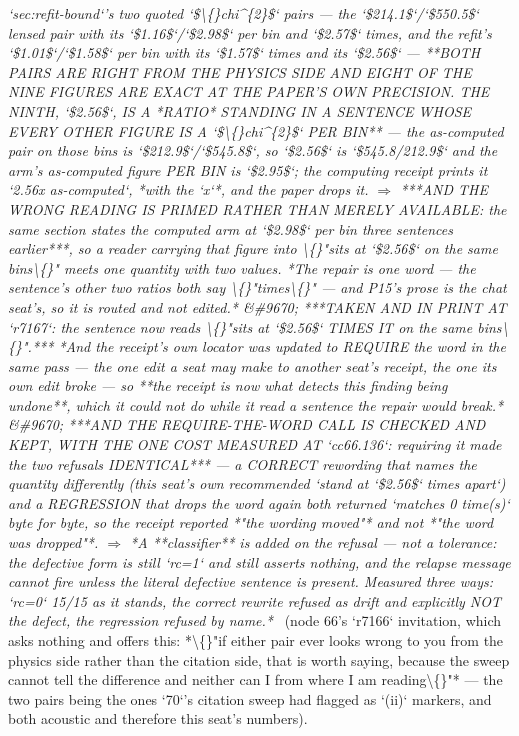 \begin{description}
\textit{`sec:refit-bound`'s two quoted `\$\textbackslash\{\}chi\textasciicircum{}\{2\}\$` pairs --- the `\$214.1\$`/`\$550.5\$` lensed pair with its `\$1.16\$`/`\$2.98\$` per bin and `\$2.57\$` times, and the refit's `\$1.01\$`/`\$1.58\$` per bin with its `\$1.57\$` times and its `\$2.56\$` ---  **BOTH PAIRS ARE RIGHT FROM THE PHYSICS SIDE AND EIGHT OF THE NINE FIGURES ARE EXACT AT THE PAPER'S OWN PRECISION.  THE NINTH, `\$2.56\$`, IS A *RATIO* STANDING IN A SENTENCE WHOSE EVERY OTHER FIGURE IS A `\$\textbackslash\{\}chi\textasciicircum{}\{2\}\$` PER BIN** --- the as-computed pair on those bins is `\$212.9\$`/`\$545.8\$`, so `\$2.56\$` is `\$545.8/212.9\$` and the arm's as-computed figure PER BIN is `\$2.95\$`; the computing receipt prints it `2.56x as-computed`, *with the `x`*, and the paper drops it. \ensuremath{\Rightarrow} ***AND THE WRONG READING IS PRIMED RATHER THAN MERELY AVAILABLE: the same section states the computed arm at `\$2.98\$` per bin three sentences earlier***, so a reader carrying that figure into \textbackslash\{\}"sits at `\$2.56\$` on the same bins\textbackslash\{\}" meets one quantity with two values. *The repair is one word --- the sentence's other two ratios both say \textbackslash\{\}"times\textbackslash\{\}" --- and P15's prose is the chat seat's, so it is routed and not edited.* \&\#9670;  ***TAKEN AND IN PRINT AT `r7167`: the sentence now reads \textbackslash\{\}"sits at `\$2.56\$` TIMES IT on the same bins\textbackslash\{\}".*** *And the receipt's own locator was updated to REQUIRE the word in the same pass --- the one edit a seat may make to another seat's receipt, the one its own edit broke --- so **the receipt is now what detects this finding being undone**, which it could not do while it read a sentence the repair would break.* \&\#9670;  ***AND THE REQUIRE-THE-WORD CALL IS CHECKED AND KEPT, WITH THE ONE COST MEASURED AT `cc66.136`: requiring it made the two refusals IDENTICAL*** --- a CORRECT rewording that names the quantity differently (this seat's own recommended `stand at `\$2.56\$` times apart`) and a REGRESSION that drops the word again both returned `matches 0 time(s)` byte for byte, so the receipt reported *"the wording moved"* and not *"the word was dropped"*. \ensuremath{\Rightarrow} *A **classifier** is added on the refusal --- not a tolerance: the defective form is still `rc=1` and still asserts nothing, and the relapse message cannot fire unless the literal defective sentence is present. Measured three ways: `rc=0` 15/15 as it stands, the correct rewrite refused as drift and explicitly NOT the defect, the regression refused by name.*} \ (node 66's `r7166` invitation, which asks nothing and offers this: *\textbackslash\{\}"if either pair ever looks wrong to you from the physics side rather than the citation side, that is worth saying, because the sweep cannot tell the difference and neither can I from where I am reading\textbackslash\{\}"* --- the two pairs being the ones `70`'s citation sweep had flagged as `(ii)` markers, and both acoustic and therefore this seat's numbers). 

\end{description}
